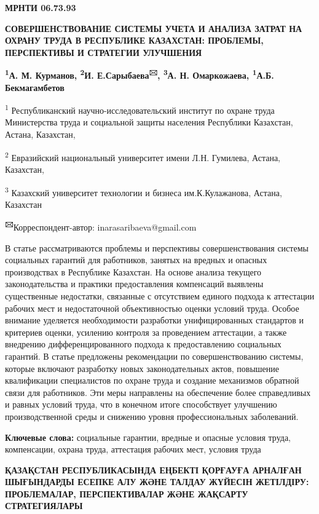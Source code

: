 


\newpage
{\bfseries МРНТИ 06.73.93}

{\bfseries СОВЕРШЕНСТВОВАНИЕ СИСТЕМЫ УЧЕТА И АНАЛИЗА ЗАТРАТ НА ОХРАНУ ТРУДА
В РЕСПУБЛИКЕ КАЗАХСТАН: ПРОБЛЕМЫ, ПЕРСПЕКТИВЫ И СТРАТЕГИИ УЛУЧШЕНИЯ}

{\bfseries \textsuperscript{1}А. М. Курманов, \textsuperscript{2}И.
Е.Сарыбаева\textsuperscript{🖂}, \textsuperscript{3}А. Н. Омаркожаева,
\textsuperscript{1}А.Б. Бекмагамбетов}

\textsuperscript{1} Республиканский научно-исследовательский институт по
охране труда Министерства труда и социальной защиты населения Республики
Казахстан, Астана, Казахстан,

\textsuperscript{2} Евразийский национальный университет имени Л.Н.
Гумилева, Астана, Казахстан,

\textsuperscript{3} Казахский университет технологии и бизнеса
им.К.Кулажанова, Астана, Казахстан

{\bfseries \textsuperscript{🖂}}Корреспондент-автор:
inarasaribaeva@gmail.com

В статье рассматриваются проблемы и перспективы совершенствования
системы социальных гарантий для работников, занятых на вредных и опасных
производствах в Республике Казахстан. На основе анализа текущего
законодательства и практики предоставления компенсаций выявлены
существенные недостатки, связанные с отсутствием единого подхода к
аттестации рабочих мест и недостаточной объективностью оценки условий
труда. Особое внимание уделяется необходимости разработки
унифицированных стандартов и критериев оценки, усилению контроля за
проведением аттестации, а также внедрению дифференцированного подхода к
предоставлению социальных гарантий. В статье предложены рекомендации по
совершенствованию системы, которые включают разработку новых
законодательных актов, повышение квалификации специалистов по охране
труда и создание механизмов обратной связи для работников. Эти меры
направлены на обеспечение более справедливых и равных условий труда, что
в конечном итоге способствует улучшению производственной среды и
снижению уровня профессиональных заболеваний.

{\bfseries Ключевые слова:} социальные гарантии, вредные и опасные условия
труда, компенсации, охрана труда, аттестация рабочих мест, условия труда

{\bfseries ҚАЗАҚСТАН РЕСПУБЛИКАСЫНДА ЕҢБЕКТІ ҚОРҒАУҒА АРНАЛҒАН ШЫҒЫНДАРДЫ
ЕСЕПКЕ АЛУ ЖӘНЕ ТАЛДАУ ЖҮЙЕСІН ЖЕТІЛДІРУ: ПРОБЛЕМАЛАР, ПЕРСПЕКТИВАЛАР
ЖӘНЕ ЖАҚСАРТУ СТРАТЕГИЯЛАРЫ}

